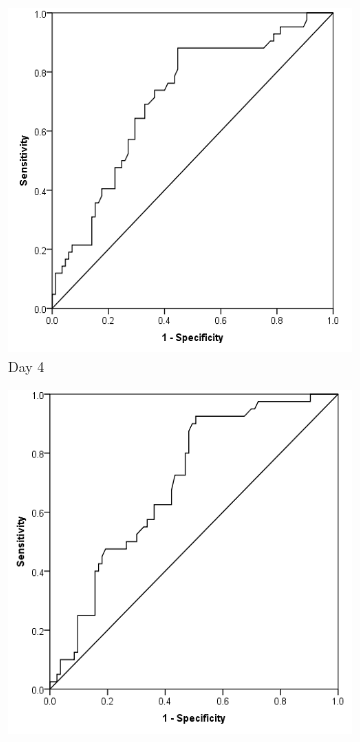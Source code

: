\begin{figure}[t]
\begin{subfigure}{0.3\textwidth}
		\includegraphics[width=\textwidth]{Figures/crp_comp_ROC_infection_D4}
		\caption{Day 4}
		\label{fig:crp_comp_ROC_infection_D4}
	\end{subfigure}
	\hfill
	\begin{subfigure}{0.3\textwidth}
		\centering
		\includegraphics[width=\textwidth]{Figures/crp_comp_ROC_infection_D5}

\end{subfigure}
\end{figure}
